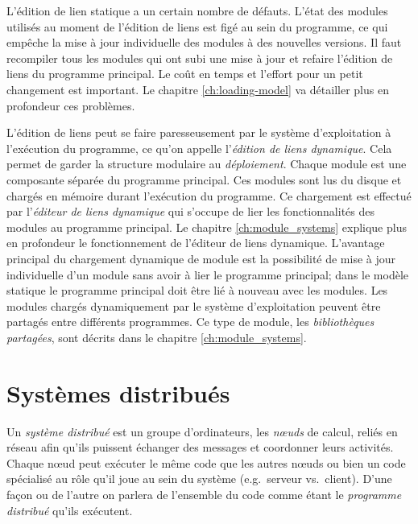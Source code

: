 L'édition de lien statique a un certain nombre de défauts. L'état des
modules utilisés au moment de l'édition de liens est figé au sein du
programme, ce qui empêche la mise à jour individuelle des modules à des nouvelles versions. Il faut
recompiler tous les modules qui ont subi une mise à jour et refaire l'édition de liens du
programme principal. Le coût en temps et l'effort pour un petit changement
est important.  Le chapitre \ref{ch:loading-model} va détailler plus en profondeur
ces problèmes.

L'édition de liens peut se faire paresseusement par le système d'exploitation à
l'exécution du programme, ce qu'on appelle l'\textit{édition de liens dynamique}.  Cela
permet de garder la structure modulaire au \textit{déploiement}.
Chaque module est une composante séparée du programme principal.  Ces modules
sont lus du disque et chargés en mémoire durant l'exécution du programme.  Ce
chargement est effectué par l'\textit{éditeur de liens dynamique} qui s'occupe de
lier les fonctionnalités des modules au programme principal. Le chapitre %
\ref{ch:module_systems} explique plus en profondeur le fonctionnement de l'éditeur de liens
dynamique. L'avantage principal du chargement dynamique de module est la possibilité de mise à jour
individuelle d'un module sans avoir à lier le programme principal; dans le
modèle statique le programme principal doit être lié à nouveau avec les modules.
Les modules chargés dynamiquement par le système d'exploitation peuvent être partagés entre différents
programmes. Ce type de module, les \textit{bibliothèques partagées}, sont décrits dans
le chapitre \ref{ch:module_systems}.

\section{Systèmes distribués}


Un \textit{système distribué} est un groupe d'ordinateurs, les
\textit{nœuds} de calcul, reliés en réseau afin qu'ils puissent
échanger des messages et coordonner leurs activités.  Chaque nœud peut
exécuter le même code que les autres nœuds ou bien un code spécialisé
au rôle qu'il joue au sein du système (e.g.~serveur vs.~client).
D'une façon ou de l'autre on parlera de l'ensemble du code comme étant
le \textit{programme distribué} qu'ils exécutent.

